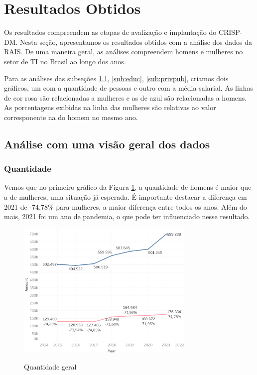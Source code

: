 \section{Resultados Obtidos}

Os resultados compreendem as etapas de avalização e implantação do CRISP-DM. Nesta seção, apresentamos os resultados obtidos com a análise dos dados da RAIS. De uma maneira geral, as análises compreendem homens e mulheres no setor de TI no Brasil ao longo dos anos. 

Para as análises das subseções \ref{sub:geral}, \ref{sub:educ}, \ref{sub:privpub}, criamos dois gráficos, um com a quantidade de pessoas e outro com a média salarial. As linhas de cor rosa são relacionadas a mulheres e as de azul são relacionadas a homens. As porcentagens exibidas na linha das mulheres são relativas ao valor corresponente na do homem no mesmo ano. 

\subsection{Análise com uma visão geral dos dados} \label{sub:geral}

\subsubsection{Quantidade}

Vemos que no primeiro gráfico da Figura \ref{fig_1_qnt}, a quantidade de homens é maior que a de mulheres, uma situação já esperada. É importante destacar a diferença em 2021 de -74,78\% para mulheres, a maior diferença entre todos os anos. Além do mais, 2021 foi um ano de pandemia, o que pode ter influenciado nesse resultado.

\begin{figure}[htbp]
	{
		\includegraphics[width=85mm]{assets/1_qnt.PNG}
	}
	\caption{Quantidade geral}
	\label{fig_1_qnt}
\end{figure}

